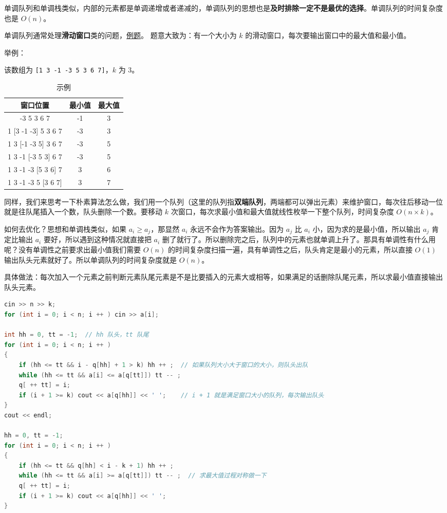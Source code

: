 

单调队列和单调栈类似，内部的元素都是单调递增或者递减的，单调队列的思想也是\textbf{及时排除一定不是最优的选择}。单调队列的时间复杂度也是 $O(n)$。

单调队列通常处理\textbf{滑动窗口}类的问题，\href{http://poj.org/problem?id=2823}{例题}。
题意大致为：有一个大小为 $k$ 的滑动窗口，每次要输出窗口中的最大值和最小值。

举例：

该数组为 \verb|[1 3 -1 -3 5 3 6 7]|，$k$ 为 $3$。

\begin{table}[ht]
\centering
\caption{示例}\label{tab_Mqueue_1}
\begin{tabular}{|c|c|c|}
\hline
窗口位置	 & 最小值	 & 最大值 \\
\hline
[1 3 -1] -3 5 3 6 7	 & -1 & 3 \\
\hline
1 [3 -1 -3] 5 3 6 7	 & -3 & 3 \\
\hline
1 3 [-1 -3 5] 3 6 7	 & -3 & 5 \\
\hline
1 3 -1 [-3 5 3] 6 7	 & -3 & 5 \\
\hline
1 3 -1 -3 [5 3 6] 7	 & 3 & 6 \\
\hline
1 3 -1 -3 5 [3 6 7]	 & 3 & 7 \\
\hline
\end{tabular}
\end{table}

同样，我们来思考一下朴素算法怎么做，我们用一个队列（这里的队列指\textbf{双端队列}，两端都可以弹出元素）来维护窗口，每次往后移动一位就是往队尾插入一个数，队头删除一个数。要移动 $k$ 次窗口，每次求最小值和最大值就线性枚举一下整个队列，时间复杂度 $O(n\times k)$。

如何去优化？思想和单调栈类似，如果 $a_i \geqslant a_j$，那显然 $a_i$ 永远不会作为答案输出。因为 $a_j$ 比 $a_i$ 小，因为求的是最小值，所以输出 $a_j$ 肯定比输出 $a_i$ 要好，所以遇到这种情况就直接把 $a_i$ 删了就行了。所以删除完之后，队列中的元素也就单调上升了。那具有单调性有什么用呢？没有单调性之前要求出最小值我们需要 $O(n)$ 的时间复杂度扫描一遍，具有单调性之后，队头肯定是最小的元素，所以直接 $O(1)$ 输出队头元素就好了。所以单调队列的时间复杂度就是 $O(n)$。

具体做法：每次加入一个元素之前判断元素队尾元素是不是比要插入的元素大或相等，如果满足的话删除队尾元素，所以求最小值直接输出队头元素。

\begin{lstlisting}[language=cpp]
cin >> n >> k;
for (int i = 0; i < n; i ++ ) cin >> a[i];

int hh = 0, tt = -1;  // hh 队头，tt 队尾
for (int i = 0; i < n; i ++ )
{
    if (hh <= tt && i - q[hh] + 1 > k) hh ++ ;  // 如果队列大小大于窗口的大小，则队头出队
    while (hh <= tt && a[i] <= a[q[tt]]) tt -- ;
    q[ ++ tt] = i;
    if (i + 1 >= k) cout << a[q[hh]] << ' ';    // i + 1 就是满足窗口大小的队列，每次输出队头
}
cout << endl;

hh = 0, tt = -1;
for (int i = 0; i < n; i ++ )
{
    if (hh <= tt && q[hh] < i - k + 1) hh ++ ;
    while (hh <= tt && a[i] >= a[q[tt]]) tt -- ;  // 求最大值过程对称做一下
    q[ ++ tt] = i;
    if (i + 1 >= k) cout << a[q[hh]] << ' ';
}
\end{lstlisting}
